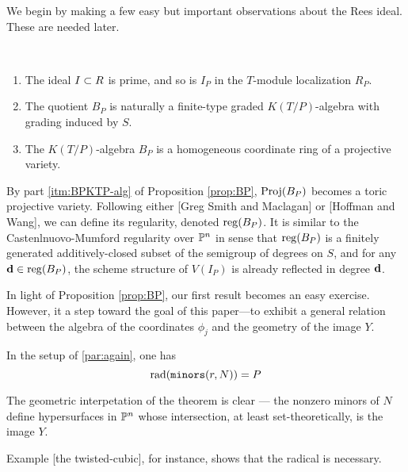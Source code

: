 \documentclass[fleqn,reqno]{amsart}
\numberwithin{first}{chapter}
\begin{document}
\begin{paragraf*}
We begin by making a few easy but important observations about the Rees ideal.
These are needed later.
\end{paragraf*}

\begin{proposition}
\label{prop:BP}~
\begin{enumerate}[label=\normalfont(\alph*)]
\item
The ideal $I\subset R$ is prime, and so is $I_P$ in the $T$-module localization $R_P$.
\item
The quotient $B_P$ is naturally a finite-type graded $K(T/P)$-algebra
with grading induced by $S$.
\item\label{itm:BPKTP-alg}
The $K(T/P)$-algebra $B_P$ is a homogeneous coordinate ring of a
projective variety.
\end{enumerate}
\end{proposition}

\begin{paragraf}
\label{par:reg-BP}
By part \ref{itm:BPKTP-alg} of Proposition \ref{prop:BP}, $\operatorname{Proj}(B_P)$ becomes a toric
projective variety.
Following either [Greg Smith and Maclagan] or [Hoffman and Wang],
we can define its regularity, denoted $\operatorname{reg}(B_P)$.
It is similar to the Castenlnuovo-Mumford regularity over $\mathbb{P}^n$ in sense that
$\operatorname{reg}(B_P)$ is a finitely generated additively-closed subset of the semigroup of degrees on $S$,
and for any $\mathbf d\in\operatorname{reg}(B_P)$, the scheme structure of $V(I_P)$ is already reflected in degree $\mathbf d$.
\end{paragraf}

\begin{paragraf*}
In light of Proposition \ref{prop:BP}, our first result becomes an easy exercise.
However, it a step toward the goal of this paper---to exhibit a general relation between
the algebra of the coordinates $\phi_j$ and the geometry of the image $Y$.
\end{paragraf*}

\begin{theorem}
\label{thm:rad-minors}
In the setup of \eqref{par:again}, one has
\[
\operatorname{rad}(\mathop{\tt minors}(r,N))=P
\]
\end{theorem}

\begin{paragraf*}
The geometric interpetation of the theorem is clear ---
the nonzero minors of $N$ define hypersurfaces in $\mathbb{P}^n$ whose intersection,
at least set-theoretically, is the image $Y$.

Example [the twisted-cubic], for instance, shows that the radical is necessary.
\end{paragraf*}
\end{document}
